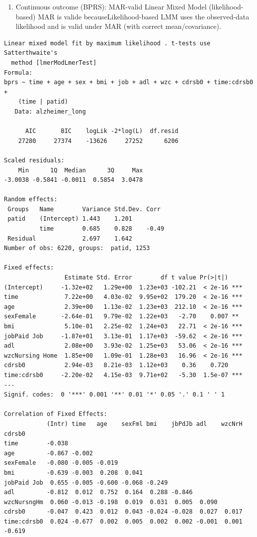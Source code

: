 \documentclass[
  11pt,
  letterpaper,
  DIV=11,
  numbers=noendperiod]{scrartcl}
\providecommand{\tightlist}{%
  \setlength{\itemsep}{0pt}\setlength{\parskip}{0pt}}\usepackage{longtable,booktabs,array}
\begin{document}
\begin{enumerate}
\def\labelenumi{\arabic{enumi}.}
\tightlist
\item
  Continuous outcome (BPRS): MAR-valid Linear Mixed Model
  (likelihood-based) MAR is valide becauseLikelihood-based LMM uses the
  observed-data likelihood and is valid under MAR (with correct
  mean/covariance).
\end{enumerate}

\begin{verbatim}
Linear mixed model fit by maximum likelihood . t-tests use Satterthwaite's
  method [lmerModLmerTest]
Formula: 
bprs ~ time + age + sex + bmi + job + adl + wzc + cdrsb0 + time:cdrsb0 +  
    (time | patid)
   Data: alzheimer_long

      AIC       BIC    logLik -2*log(L)  df.resid 
    27280     27374    -13626     27252      6206 

Scaled residuals: 
    Min      1Q  Median      3Q     Max 
-3.0038 -0.5841 -0.0011  0.5854  3.0478 

Random effects:
 Groups   Name        Variance Std.Dev. Corr 
 patid    (Intercept) 1.443    1.201         
          time        0.685    0.828    -0.49
 Residual             2.697    1.642         
Number of obs: 6220, groups:  patid, 1253

Fixed effects:
                 Estimate Std. Error        df t value Pr(>|t|)    
(Intercept)     -1.32e+02   1.29e+00  1.23e+03 -102.21  < 2e-16 ***
time             7.22e+00   4.03e-02  9.95e+02  179.20  < 2e-16 ***
age              2.39e+00   1.13e-02  1.23e+03  212.10  < 2e-16 ***
sexFemale       -2.64e-01   9.79e-02  1.22e+03   -2.70    0.007 ** 
bmi              5.10e-01   2.25e-02  1.24e+03   22.71  < 2e-16 ***
jobPaid Job     -1.87e+01   3.13e-01  1.17e+03  -59.62  < 2e-16 ***
adl              2.08e+00   3.93e-02  1.25e+03   53.06  < 2e-16 ***
wzcNursing Home  1.85e+00   1.09e-01  1.28e+03   16.96  < 2e-16 ***
cdrsb0           2.94e-03   8.21e-03  1.12e+03    0.36    0.720    
time:cdrsb0     -2.20e-02   4.15e-03  9.71e+02   -5.30  1.5e-07 ***
---
Signif. codes:  0 '***' 0.001 '**' 0.01 '*' 0.05 '.' 0.1 ' ' 1

Correlation of Fixed Effects:
            (Intr) time   age    sexFml bmi    jbPdJb adl    wzcNrH cdrsb0
time        -0.038                                                        
age         -0.867 -0.002                                                 
sexFemale   -0.080 -0.005 -0.019                                          
bmi         -0.639 -0.003  0.208  0.041                                   
jobPaid Job  0.655 -0.005 -0.600 -0.068 -0.249                            
adl         -0.812  0.012  0.752  0.164  0.288 -0.846                     
wzcNursngHm  0.060 -0.013 -0.198  0.019  0.031  0.005  0.090              
cdrsb0      -0.047  0.423  0.012  0.043 -0.024 -0.028  0.027  0.017       
time:cdrsb0  0.024 -0.677  0.002  0.005  0.002  0.002 -0.001  0.001 -0.619
\end{verbatim}
\end{document}
